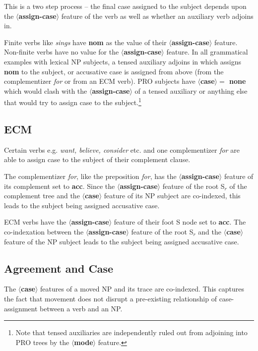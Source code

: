  
This is a two step process -- the final case assigned to the subject 
depends upon the {\bf $\langle$assign-case$\rangle$} feature of the 
verb as well as whether an auxiliary verb adjoins in. 
 
Finite verbs like {\em sings} have {\bf nom} as the value of their 
{\bf $\langle$assign-case$\rangle$} feature. Non-finite verbs have 
no value for the {\bf $\langle$assign-case$\rangle$} 
feature. In all grammatical examples with lexical NP subjects, a tensed 
auxiliary adjoins in which assigns {\bf nom} to the subject, or accusative case 
is assigned from above (from the complementizer {\it for} or from an ECM 
verb). PRO subjects have {\bf $\langle$case$\rangle =$ none} which would clash 
with the {\bf $\langle$assign-case$\rangle$} of a tensed auxiliary or anything 
else that would try to assign case to the subject.\footnote{Note that tensed auxiliaries are independently ruled out from adjoining into PRO trees by the {\bf $\langle$mode$\rangle$} feature.} 
 
 
\subsection{ECM} 
Certain verbs e.g. {\em want, believe, consider} etc. and one complementizer 
{\em for} are able to assign case to the subject of their complement clause. 
 
The complementizer {\em for}, like the preposition {\em for}, has the 
{\bf $\langle$assign-case$\rangle$} feature of its complement set to 
{\bf acc}. Since the {\bf $\langle$assign-case$\rangle$} feature of 
the root S$_{r}$ of the complement tree and the {\bf $\langle$case$\rangle$} feature of its NP subject are co-indexed, this 
leads to the subject being assigned accusative case. 
 
ECM verbs have the {\bf $\langle$assign-case$\rangle$}  feature of their 
foot S node set to {\bf acc}. The co-indexation between the 
{\bf $\langle$assign-case$\rangle$} feature of 
the root S$_{r}$ and the {\bf $\langle$case$\rangle$} feature of the NP subject 
leads to the subject being assigned accusative case. 
 
\subsection{Agreement and Case} 
The {\bf $\langle$case$\rangle$} features of a moved NP and its trace 
are co-indexed. This captures the fact that movement does not disrupt 
a pre-existing relationship of case-assignment between a verb and an NP. 
 
